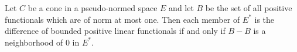 Let $C$ be a cone in a pseudo-normed space $E$ and let $B$ be the set of all positive functionals which are of norm at most one. Then each member of $E^*$ is the difference of bounded positive linear functionals if and only if $B - B$ is a neighborhood of $0$ in $E^*$.
